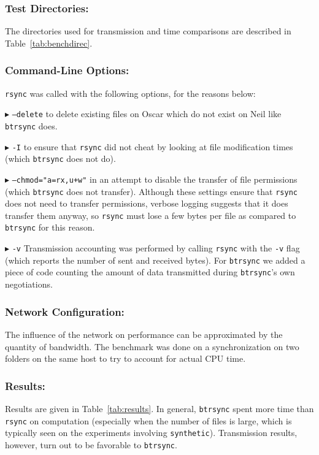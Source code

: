 \documentclass[11pt]{llncs}
\newcommand{\btrsync}{\texttt{btrsync}\xspace}
\newcommand{\rsync}{\texttt{rsync}\xspace}
\begin{document}
\subsubsection{Test Directories:} The directories used for transmission and time
comparisons are described in Table~\ref{tab:benchdirec}.\smallskip

\subsubsection{Command-Line Options:} \rsync was called with the following options, for the reasons below:

$\blacktriangleright$ {\tt --delete} to delete existing files on Oscar which do
not exist on Neil like \btrsync does.\smallskip

$\blacktriangleright$ {\tt -I} to ensure that \rsync did not cheat by looking at file modification times (which \btrsync does not do).\smallskip

$\blacktriangleright$ {\tt --chmod="a=rx,u+w"} in an attempt to disable the transfer of file permissions (which \btrsync does not transfer). Although these settings ensure that \rsync does not need to transfer permissions, verbose logging suggests that it does transfer them anyway, so \rsync must lose a few bytes per file as compared to \btrsync for this reason.\smallskip

$\blacktriangleright$ {\tt -v} Transmission accounting was performed by calling \rsync with the {\tt -v} flag (which reports the number of sent and received bytes). For \btrsync we added a piece of code counting the amount of data transmitted during \btrsync's own negotiations.\smallskip

\subsubsection{Network Configuration:} The influence of the network on
performance can be approximated by the quantity of bandwidth. The benchmark was
done on a synchronization on two folders on the same host to try to account for
actual CPU time.

\subsubsection{Results:}

Results are given in Table~\ref{tab:results}. In general, \btrsync spent more
time than \rsync on computation (especially when the number of files is large,
which is typically seen on the experiments involving {\tt synthetic}).
Transmission results, however, turn out to be favorable to \btrsync.\smallskip
\end{document}
